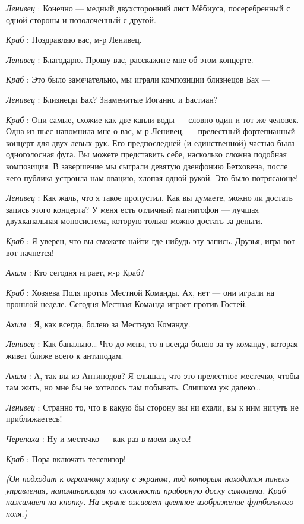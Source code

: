 \documentclass[../main.tex]{subfiles}
\begin{document}
\begin{dialogue}
\emph{Ленивец} : Конечно --- медный двухсторонний лист Мёбиуса, посеребренный с одной стороны и позолоченный с другой.

\emph{Краб} : Поздравляю вас, м-р Ленивец.

\emph{Ленивец} : Благодарю. Прошу вас, расскажите мне об этом концерте.

\emph{Краб} : Это было замечательно, мы играли композиции близнецов Бах ---

\emph{Ленивец} : Близнецы Бах? Знаменитые Иоганнс и Бастиан?

\emph{Краб} : Они самые, схожие как две капли воды --- словно один и тот же человек. Одна из пьес напомнила мне о вас, м-р Ленивец, --- прелестный фортепианный концерт для двух левых рук. Его предпоследней (и единственной) частью была одноголосная фуга. Вы можете представить себе, насколько сложна подобная композиция. В завершение мы сыграли девятую дзенфонию Бетховена, после чего публика устроила нам овацию, хлопая одной рукой. Это было потрясающе!

\emph{Ленивец} : Как жаль, что я такое пропустил. Как вы думаете, можно ли достать запись этого концерта? У меня есть отличный магнитофон --- лучшая двухканальная моносистема, которую только можно достать за деньги.

\emph{Краб} : Я уверен, что вы сможете найти где-нибудь эту запись. Друзья, игра вот-вот начнется!

\emph{Ахилл} : Кто сегодня играет, м-р Краб?

\emph{Краб} : Хозяева Поля против Местной Команды. Ах, нет --- они играли на прошлой неделе. Сегодня Местная Команда играет против Гостей.

\emph{Ахилл} : Я, как всегда, болею за Местную Команду.

\emph{Ленивец} : Как банально\ldots{} Что до меня, то я всегда болею за ту команду, которая живет ближе всего к антиподам.

\emph{Ахилл} : А, так вы из Антиподов? Я слышал, что это прелестное местечко, чтобы там жить, но мне бы не хотелось там побывать. Слишком уж далеко\ldots{}

\emph{Ленивец} : Странно то, что в какую бы сторону вы ни ехали, вы к ним ничуть не приближаетесь!

\emph{Черепаха} : Ну и местечко --- как раз в моем вкусе!

\emph{Краб} : Пора включать телевизор!

\emph{(Он подходит к огромному ящику с экраном, под которым находится панель управления, напоминающая по сложности приборную доску самолета. Краб нажимает на кнопку. На экране оживает цветное изображение футбольного поля.)}


\end{dialogue}
\end{document}
